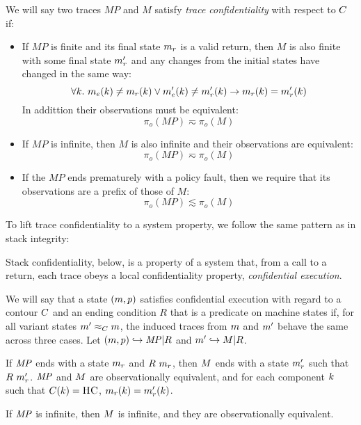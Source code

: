 \documentclass[acmsmall,review,anonymous]{acmart}\settopmatter{printfolios=true,printccs=false,printacmref=false}
\begin{document}
We will say two traces $MP$ and $M$ satisfy {\em trace
  confidentiality} with respect to $C$ if:
\begin{itemize}
\item If $MP$ is finite and its final state $m_r$ is a valid
  return, then $M$ is also finite with some final state $m_r'$ and
  any changes from the initial states have changed in the same way:
$$\forall k. ~ m_e(k) \not = m_r(k)
  \vee m_e'(k) \not = m_r'(k) \rightarrow
  m_r(k) = m_r'(k)$$
  In addittion their observations must be equivalent:
  $$\pi_o(MP) \eqsim \pi_o(M)$$
\item If $MP$ is infinite, then $M$ is also infinite and their
  observations are equivalent:
  $$\pi_o(MP) \eqsim \pi_o(M)$$
\item If the $MP$ ends prematurely with a policy fault, then
  we require that its observations are a prefix of those of $M$:
  $$\pi_o(MP) \lesssim \pi_o(M)$$
\end{itemize}


To lift trace confidentiality to a system property, we follow the same
pattern as in stack integrity:

  Stack confidentiality, below, is a property of a system that, from a call to
  a return, each trace obeys a local confidentiality property,
  {\it confidential execution}.

  We will say that a state \((m,p)\) satisfies confidential
  execution with regard to a contour \(C\) and an ending condition
  \(R\) that is a predicate on machine states if, for all variant states
  \(m' \approx_C m\), the induced traces from \(m\) and
  \(m'\) behave the same across three cases. Let
  \((m,p) \hookrightarrow \mathit{MP} | R\) and
  \(m' \hookrightarrow M | R\).

  If \(\mathit{MP}\) ends with a state \(m_r\) and \(R\ \mach_r\), then \(M\)
  ends with a state \(m_r'\) such that \(R\ m_r'\). \(\mathit{MP}\) and
  \(M\) are observationally equivalent, and for each component
  \(k\) such that \(C(k) = \textsc{HC}\),
  \(m_r(k) = m_r'(k)\).

  If \(\mathit{MP}\) is infinite, then \(M\) is infinite, and they are
  observationally equivalent.
\end{document}
